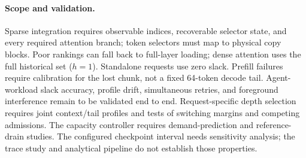 \paragraph{Scope and validation.}
\label{sec:design-discussion}
Sparse integration requires observable indices, recoverable selector
state, and every required attention branch; token selectors must map
to physical copy blocks. Poor rankings can fall back to full-layer
loading; dense attention uses the full historical set ($h=1$). Standalone requests
use zero slack. Prefill failures require calibration for the lost chunk,
not a fixed 64-token decode tail. Agent-workload slack accuracy, profile
drift, simultaneous retries, and foreground interference remain to be
validated end to end. Request-specific depth selection requires joint
context/tail profiles and tests of switching margins and competing admissions.
The capacity controller requires demand-prediction and reference-drain studies.
The configured checkpoint interval needs sensitivity analysis;
the trace study and analytical pipeline do not establish those properties.

